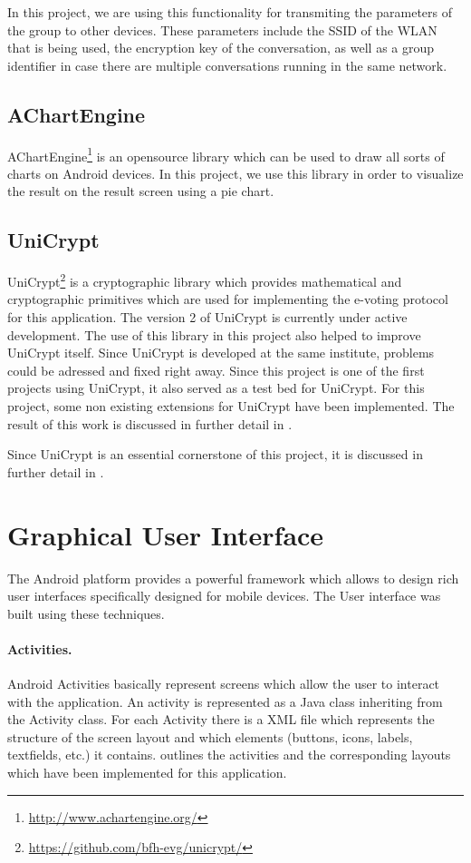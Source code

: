 \documentclass[numbers=noenddot, abstract=on, a4paper, headsepline,
footsepline, oneside, draft=off]{scrreprt}
\begin{document}
In this project, we are using this functionality for transmiting the parameters
of the group to other devices. These parameters include the SSID of the WLAN
that is being used, the encryption key of the conversation, as well as a group
identifier in case there are multiple conversations running in the same network.

\subsection{AChartEngine}
AChartEngine\footnote{\url{http://www.achartengine.org/}} is an opensource
library which can be used to draw all sorts of charts on Android devices. In
this project, we use this library in order to visualize the result on the
result screen using a pie chart.

\subsection{UniCrypt}
UniCrypt\footnote{\url{https://github.com/bfh-evg/unicrypt/}} is a cryptographic
library which provides mathematical and cryptographic primitives which are used
for implementing the e-voting protocol for this application. The version 2 of
UniCrypt is currently under active development. The use of this library in this
project also helped to improve UniCrypt itself. Since UniCrypt is developed at
the same institute, problems could be adressed and fixed right away. Since this
project is one of the first projects using UniCrypt, it also served as a test
bed for UniCrypt. For this project, some non existing extensions for UniCrypt
have been implemented. The result of this work is discussed in further detail in
.

Since UniCrypt is an essential cornerstone of this project, it is discussed in
further detail in .

\section{Graphical User Interface}
\label{sec:graphicaluserinterface}

The Android platform provides a powerful framework which allows to design rich
user interfaces specifically designed for mobile devices. The User interface was
built using these techniques.

\paragraph{Activities.}
Android Activities basically represent screens which allow the user to interact
with the application. An activity is represented as a Java class inheriting from
the Activity class. For each Activity there is a XML file which represents the
structure of the screen layout and which elements (buttons, icons, labels,
textfields, etc.) it contains.  outlines the activities and
the corresponding layouts which have been implemented for this application.
\end{document}

